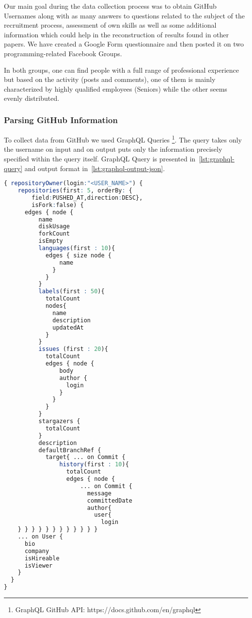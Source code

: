 \documentclass[graybox]{svmult}
\begin{document}
Our main goal during the data collection process was to obtain GitHub Usernames along with as many answers to questions related to the subject of the recruitment process, assessment of own skills as well as some additional information which could help in the reconstruction of results found in other papers. We have created a Google Form questionnaire and then posted it on two programming-related Facebook Groups.

In both groups, one can find people with a full range of professional experience but based on the activity (posts and comments), one of them is mainly characterized by highly qualified employees (Seniors) while the other seems evenly distributed.

\subsubsection{Parsing GitHub Information}

To collect data from GitHub we used GraphQL Queries \footnote{GraphQL GitHub API: https://docs.github.com/en/graphql}. The query takes only the username on input and on output puts only the information precisely specified within the query itself. GraphQL Query is presented in~\ref{lst:graphql-query} and output format in~\ref{lst:graphql-output-json}.


\begin{lstlisting}[language=R, label={lst:graphql-query}]
{ repositoryOwner(login:"<USER_NAME>") {
    repositories(first: 5, orderBy: {
        field:PUSHED_AT,direction:DESC},
        isFork:false) {
      edges { node {
          name
          diskUsage
          forkCount
          isEmpty
          languages(first : 10){
            edges { size node {
                name
              }
            }
          }
          labels(first : 50){
            totalCount
            nodes{
              name
              description
              updatedAt
            }
          }
          issues (first : 20){
            totalCount
            edges { node {
                body
                author {
                  login
                }
              }
            }
          }
          stargazers {
            totalCount
          }
          description
          defaultBranchRef {
            target{ ... on Commit {
                history(first : 10){
                  totalCount
                  edges { node {
                      ... on Commit {
                        message
                        committedDate
                        author{
                          user{
                            login
    } } } } } } } } } } } }
    ... on User {
      bio
      company
      isHireable
      isViewer
    }
  }
}
\end{lstlisting}
\end{document}
